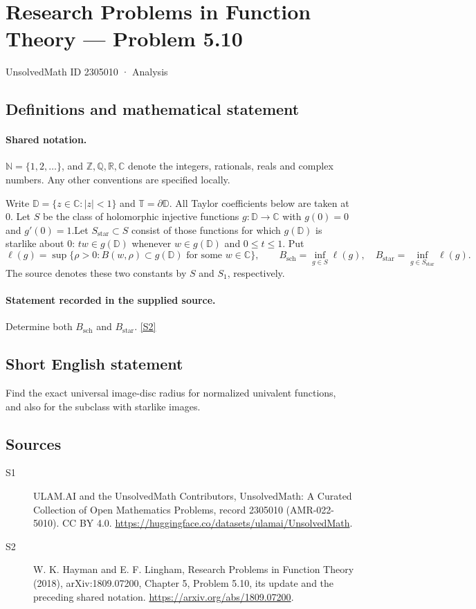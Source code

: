\documentclass[11pt]{article}
\newcommand{\sref}[2]{\hyperlink{source:#1:#2}{[S#2]}}
\begin{document}
\setcounter{section}{2305009}
\section{Research Problems in Function Theory — Problem 5.10}\label{2305010}
{\small\sffamily UnsolvedMath ID 2305010 · Analysis}
\subsection{Definitions and mathematical statement}

\paragraph{Shared notation.}$\mathbb N=\{1,2,\ldots\}$, and $\mathbb Z,\mathbb Q,\mathbb R,\mathbb C$ denote the integers, rationals, reals and complex numbers. Any other conventions are specified locally.


Write $\mathbb D=\{z\in\mathbb C:|z|<1\}$ and $\mathbb T=\partial\mathbb D$. All Taylor coefficients below are taken at $0$. Let $S$ be the class of holomorphic injective functions $g:\mathbb D\to\mathbb C$ with $g(0)=0$ and $g'(0)=1$.Let $S_{\mathrm{star}}\subset S$ consist of those functions for which $g(\mathbb D)$ is starlike about $0$: $tw\in g(\mathbb D)$ whenever $w\in g(\mathbb D)$ and $0\le t\le1$. Put
\[\ell(g)=\sup\{\rho>0:B(w,\rho)\subset g(\mathbb D)\text{ for some }w\in\mathbb C\},\qquad
B_{\mathrm{sch}}=\inf_{g\in S}\ell(g),\quad B_{\mathrm{star}}=\inf_{g\in S_{\mathrm{star}}}\ell(g).\]
The source denotes these two constants by $S$ and $S_1$, respectively.
\paragraph{Statement recorded in the supplied source.}
Determine both $B_{\mathrm{sch}}$ and $B_{\mathrm{star}}$. \sref{2305010}{2}
\subsection{Short English statement}
Find the exact universal image-disc radius for normalized univalent functions, and also for the subclass with starlike images.
\subsection{Sources}
\begin{description}
\item[\hypertarget{source:2305010:1}{S1}] ULAM.AI and the UnsolvedMath Contributors, UnsolvedMath: A Curated Collection of Open Mathematics Problems, record 2305010 (AMR-022-5010). CC BY 4.0. \url{https://huggingface.co/datasets/ulamai/UnsolvedMath}.
\item[\hypertarget{source:2305010:2}{S2}] W. K. Hayman and E. F. Lingham, Research Problems in Function Theory (2018), arXiv:1809.07200, Chapter 5, Problem 5.10, its update and the preceding shared notation. \url{https://arxiv.org/abs/1809.07200}.
\end{description}
\label{end:2305010}
\end{document}
